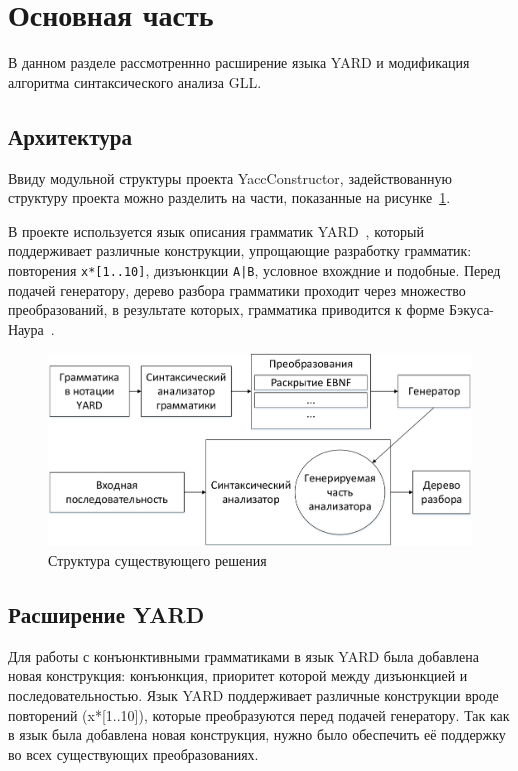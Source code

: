 \section{Основная часть}

В данном разделе рассмотреннно расширение языка YARD и модификация алгоритма синтаксического анализа GLL.


\subsection{Архитектура}

Ввиду модульной структуры проекта YaccConstructor, задействованную структуру проекта можно разделить на части, показанные на рисунке~\ref{project_structure}.

В проекте используется язык описания грамматик YARD~\cite{YARD}, который поддерживает различные конструкции, упрощающие разработку грамматик: повторения \verb|x*[1..10]|, дизъюнкции \texttt{A|B}, условное вхождние и подобные. Перед подачей генератору, дерево разбора грамматики проходит через множество преобразований, в результате которых, грамматика приводится к форме Бэкуса-Наура~\cite{BNF}.

\begin{figure}[h]
\centering
\includegraphics[width=\textwidth]{Gorokhov/courseworkpictures/img2.pdf}
\caption{Структура существующего решения}
\label{project_structure}
\end{figure}

\subsection{Расширение YARD}
Для работы с конъюнктивными грамматиками в язык YARD была добавлена новая конструкция: конъюнкция, приоритет которой между дизъюнкцией и последовательностью. Язык YARD поддерживает различные конструкции вроде повторений (x*[1..10]), которые преобразуются перед подачей генератору. Так как в язык была добавлена новая конструкция, нужно было обеспечить её поддержку во всех существующих преобразованиях.

